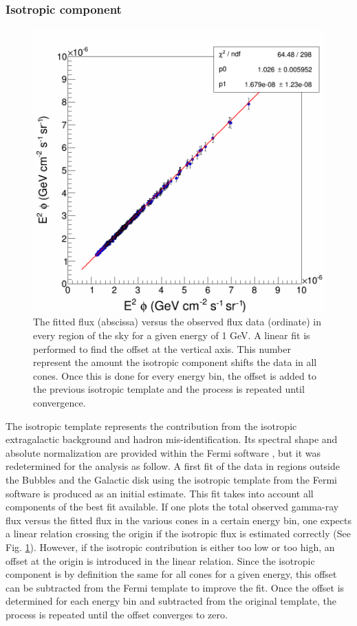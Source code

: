 \subsubsection{Isotropic component}

\begin{figure}
 \centering
 \includegraphics[width=.5\linewidth]{pic/method/iso_calibration.png}
 \caption{The fitted flux (abscissa) versus the observed flux data (ordinate) in every region of the sky for a given energy of 1 GeV. A linear fit is performed to find the offset at the vertical axis. This number represent the amount the isotropic component shifts the data in all cones. Once this is done for every energy bin, the offset is added to the previous isotropic template and the process is repeated until convergence. }
 \label{fig:iso_calibration}
\end{figure}


The isotropic template represents the contribution from the isotropic extragalactic background and hadron mis-identification. Its spectral shape and absolute normalization are provided within the Fermi software , but it was redetermined for the analysis as follow.
A first fit of the data in regions outside the Bubbles and the Galactic disk using the isotropic template from the Fermi software is produced as an initial estimate. This fit takes into account all components of the best fit available.
If one plots the total observed gamma-ray flux versus the fitted flux in the various cones in a certain energy bin, one expects a linear relation crossing the origin if the isotropic flux is estimated correctly (See Fig. \ref{fig:iso_calibration}). However, if the isotropic contribution is either too low or too high, an offset at the origin is introduced in the linear relation. Since the isotropic component is by definition the same for all cones for a given energy, this offset can be subtracted from the Fermi template to improve the fit. 
Once the offset is determined for each energy bin and subtracted from the original template, the process is repeated until the offset converges to zero.

